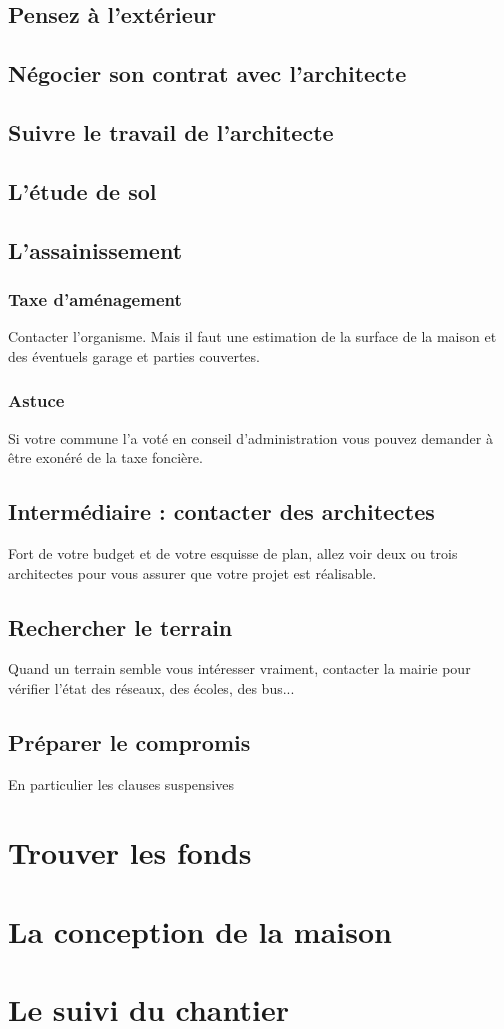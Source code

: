 \documentclass[french]{book}
\begin{document}
\section{Pensez à l’extérieur}
\section{Négocier son contrat avec l’architecte}
\section{Suivre le travail de l’architecte}
\section{L’étude de sol}
\section{L’assainissement}



\subsection{Taxe d'aménagement}
Contacter l'organisme. Mais il faut une estimation de la surface de la maison et des éventuels garage et parties couvertes.

\subsection{Astuce}
Si votre commune l'a voté en conseil d'administration vous pouvez demander à être exonéré de la taxe foncière.

\section{Intermédiaire : contacter des architectes}
Fort de votre budget et de votre esquisse de plan, allez voir deux ou trois architectes pour vous assurer que votre projet est réalisable.

\section{Rechercher le terrain}
Quand un terrain semble vous intéresser vraiment, contacter la mairie pour vérifier l'état des réseaux, des écoles, des bus...

\section{Préparer le compromis}
En particulier les clauses suspensives

\chapter{Trouver les fonds}
\chapter{La conception de la maison}
\chapter{Le suivi du chantier}
\end{document}
